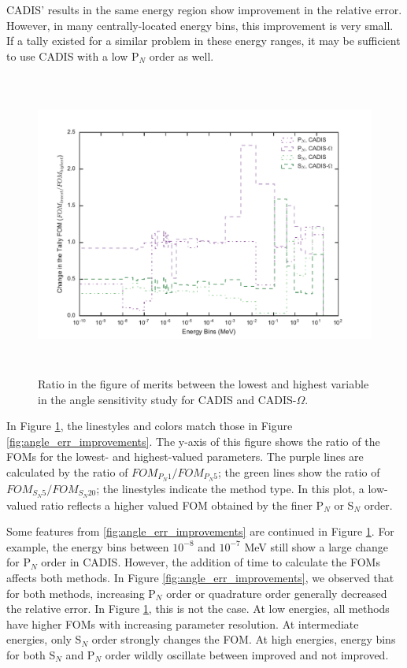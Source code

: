 CADIS' results in the same energy region show improvement in the
relative error. However, in many centrally-located energy bins, this improvement
is very small. If a tally existed for a similar problem in these energy ranges,
it may be sufficient to use CADIS with a low P$_N$ order as well.

\begin{figure}[h!]
  \centering
  \includegraphics[height=10cm]{./chapters/characterization_probs/figures/angle/prob_1/improvement_fom_allmethds.pdf}
  \caption[Ratio in the figure of merits between the lowest and highest variable in the angle
  sensitivity study for CADIS and CADIS-$\Omega$.]{Ratio in the figure of merits between
    the lowest and highest variable in the angle sensitivity study for CADIS and CADIS-$\Omega$.}
  \label{fig:angle_fom_improvements}
\end{figure}

In Figure \ref{fig:angle_fom_improvements}, the linestyles and colors match
those in Figure \ref{fig:angle_err_improvements}. The y-axis of this figure
shows the ratio of the FOMs for the lowest- and highest-valued parameters. The
purple lines are calculated by the ratio of $FOM_{P_N 1}/FOM_{P_N 5}$;
the green lines show the
ratio of $FOM_{S_N 5}/FOM_{S_N 20}$; the linestyles indicate the method
type. In this plot, a low-valued ratio reflects a higher valued FOM obtained by
the finer P$_N$ or S$_N$ order.

Some features from \ref{fig:angle_err_improvements} are continued in Figure
\ref{fig:angle_fom_improvements}. For example, the energy bins between $10^{-8}$
and $10^{-7}$ MeV still show a large change for P$_N$ order in CADIS. However,
the addition of time to calculate the FOMs affects both methods. In Figure
\ref{fig:angle_err_improvements}, we observed that for both methods, increasing
P$_N$ order or quadrature order generally decreased the relative error. In
Figure \ref{fig:angle_fom_improvements}, this is not the case. At low energies,
all methods have higher FOMs with increasing parameter resolution. At
intermediate energies, only S$_N$ order strongly changes the FOM. At high
energies, energy bins for both S$_N$ and P$_N$ order wildly oscillate between
improved and not improved.

